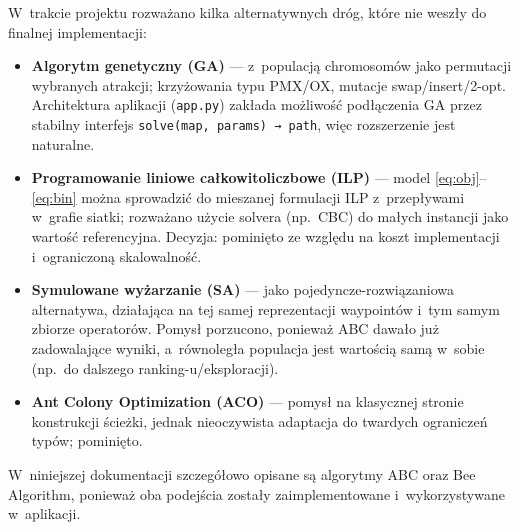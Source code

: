W~trakcie projektu rozważano kilka alternatywnych dróg, które nie weszły
do finalnej implementacji:
\begin{itemize}
    \item \textbf{Algorytm genetyczny (GA)} --- z~populacją chromosomów
          jako permutacji wybranych atrakcji; krzyżowania typu PMX/OX,
          mutacje swap/insert/2-opt. Architektura aplikacji (\texttt{app.py})
          zakłada możliwość podłączenia GA przez stabilny interfejs
          \texttt{solve(map, params) → path}, więc rozszerzenie jest naturalne.
    \item \textbf{Programowanie liniowe całkowitoliczbowe (ILP)} --- model
          \eqref{eq:obj}--\eqref{eq:bin} można sprowadzić do mieszanej
          formulacji ILP z~przepływami w~grafie siatki; rozważano użycie
          solvera (np.\ CBC) do małych instancji jako wartość referencyjna.
          Decyzja: pominięto ze względu na koszt implementacji i~ograniczoną
          skalowalność.
    \item \textbf{Symulowane wyżarzanie (SA)} --- jako pojedyncze-rozwiązaniowa
          alternatywa, działająca na tej samej reprezentacji waypointów
          i~tym samym zbiorze operatorów. Pomysł porzucono, ponieważ ABC
          dawało już zadowalające wyniki, a~równoległa populacja jest
          wartością samą w~sobie (np.\ do dalszego ranking-u/eksploracji).
    \item \textbf{Ant Colony Optimization (ACO)} --- pomysł na klasycznej
          stronie konstrukcji ścieżki, jednak nieoczywista adaptacja do
          twardych ograniczeń typów; pominięto.
\end{itemize}

W~niniejszej dokumentacji szczegółowo opisane są algorytmy ABC oraz Bee Algorithm,
ponieważ oba podejścia zostały zaimplementowane i~wykorzystywane w~aplikacji.
